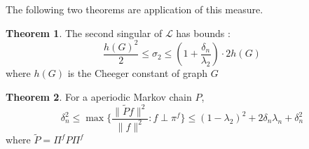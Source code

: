 \documentclass[twoside]{article}
\theoremstyle{definition}
\newtheorem{thm}{Theorem}[section]
\theoremstyle{definition}
\theoremstyle{remark}
\def\L{{\mathcal L}}
\begin{document}
The following two theorems are application of this measure.
\begin{thm}
The second singular of $\L$ has bounds :
\begin{equation}
  \frac{h(G)^2}{2} \le \sigma_2 \le (1 + \frac{\delta_n}{\lambda_2}) \cdot 2h(G)
\end{equation}
where $h(G)$ is the Cheeger constant of graph $G$
\end{thm}

\begin{thm}
For a aperiodic Markov chain $P$,
\begin{equation}
  \delta_n^2 \le \max\{\frac{\|\tilde{P}f\|^2}{\|f\|^2}:f\perp\pi^f\} \le(1-\lambda_2)^2 + 2\delta_n\lambda_n + \delta_n^2
\end{equation}
where $\tilde{P} = \Pi^f P \Pi^f$
\end{thm}



\end{document}
